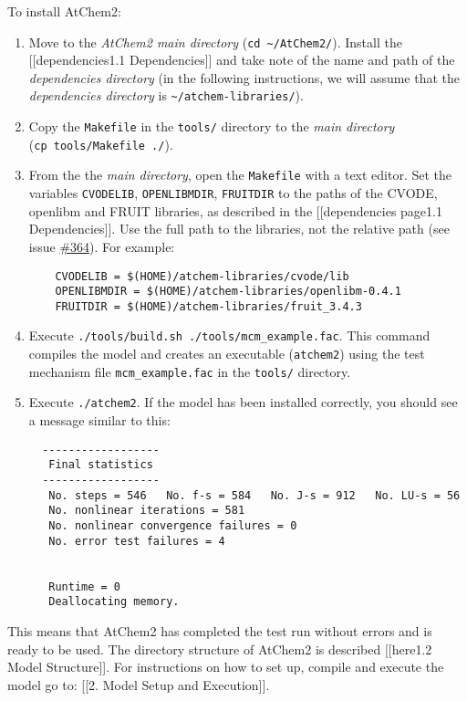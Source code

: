 To install AtChem2:

\begin{enumerate}
\item Move to the \emph{AtChem2 main directory} (\texttt{cd\
    \textasciitilde{}/AtChem2/}).  Install the
  {[}{[}dependencies\textbar{}1.1 Dependencies{]}{]} and take note of
  the name and path of the \emph{dependencies directory} (in the
  following instructions, we will assume that the \emph{dependencies
    directory} is \texttt{\textasciitilde{}/atchem-libraries/}).
\item Copy the \texttt{Makefile} in the \texttt{tools/} directory to
  the \emph{main directory} (\texttt{cp\ tools/Makefile\ ./}).
\item From the the \emph{main directory}, open the \texttt{Makefile}
  with a text editor. Set the variables \texttt{CVODELIB},
  \texttt{OPENLIBMDIR}, \texttt{FRUITDIR} to the paths of the CVODE,
  openlibm and FRUIT libraries, as described in the {[}{[}dependencies
  page\textbar{}1.1 Dependencies{]}{]}. Use the full path to the
  libraries, not the relative path (see issue
  \href{https://github.com/AtChem/AtChem2/issues/364}{\#364}). For
  example:
  \begin{verbatim}
    CVODELIB = $(HOME)/atchem-libraries/cvode/lib
    OPENLIBMDIR = $(HOME)/atchem-libraries/openlibm-0.4.1
    FRUITDIR = $(HOME)/atchem-libraries/fruit_3.4.3
\end{verbatim}
\item Execute \texttt{./tools/build.sh\
    ./tools/mcm\_example.fac}. This command compiles the model and
  creates an executable (\texttt{atchem2}) using the test mechanism
  file \texttt{mcm\_example.fac} in the \texttt{tools/} directory.
\item Execute \texttt{./atchem2}. If the model has been installed
  correctly, you should see a message similar to this:
\begin{verbatim}
  ------------------
   Final statistics
  ------------------
   No. steps = 546   No. f-s = 584   No. J-s = 912   No. LU-s = 56
   No. nonlinear iterations = 581
   No. nonlinear convergence failures = 0
   No. error test failures = 4


   Runtime = 0
   Deallocating memory.
\end{verbatim}
\end{enumerate}

This means that AtChem2 has completed the test run without errors and
is ready to be used. The directory structure of AtChem2 is described
{[}{[}here\textbar{}1.2 Model Structure{]}{]}. For instructions on how
to set up, compile and execute the model go to: {[}{[}2. Model Setup
and Execution{]}{]}.

